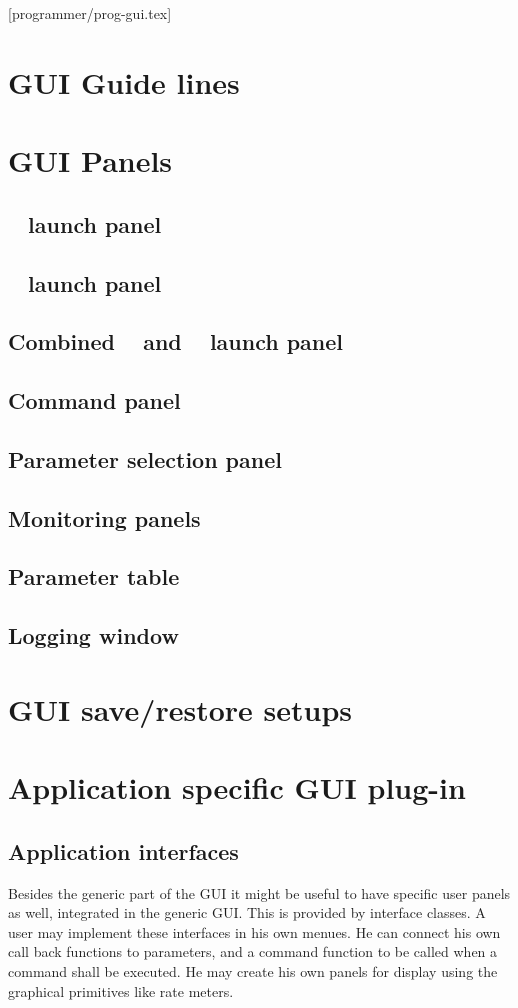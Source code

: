[programmer/prog-gui.tex]
\section{GUI Guide lines}
\section{GUI Panels}
\subsection{\dabc~ launch panel}
\subsection{\mbs~ launch panel}
\subsection{Combined \dabc~ and \mbs~ launch panel}
\subsection{Command panel}
\subsection{Parameter selection panel}
\subsection{Monitoring panels}
\subsection{Parameter table}
\subsection{Logging window}
\section{GUI save/restore setups}
\section{Application specific GUI plug-in}
\subsection{Application interfaces}
Besides the generic part of the GUI it might be useful to have specific user panels as well, integrated in the generic GUI. This is provided by interface classes. A user may implement these interfaces in his own menues. He can connect his own call back functions to parameters, and a command function to be called when a command shall be executed. He may create his own panels for display using the graphical primitives like rate meters.

